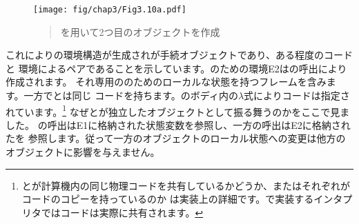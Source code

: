 \begin{figure}[tb]
\label{Figure 3.10}
\centering
\begin{comment}
\heading{Figure 3.10:} Using \code{(define W2 (make\-/withdraw 100))} to create a second object.

\begin{example}
         +-------------------------------------------------+
         | make-withdraw: ...                              |
global ->| W2: ---------------------------+                |
env      | W1: --+                        |                |
         +-------|------------------------|----------------+
                 |              ^         |              ^
                 |              |         |              |
                 |       +------+------+  |       +------+-------+
                 |  E1 ->| balance: 50 |  |  E2 ->| balance: 100 |
                 |       +-------------+  |       +--------------+
                 V              ^         V              ^
             .---.---.          |     .---.---.          |
             | O | O-+----------+     | O | O-+----------+
             `-|-^---'                `-|-^---'
               | +----------------------+
               V V
        parameters: amount
        body: ...
\end{example}
\end{comment}
\texttt{[image: fig/chap3/Fig3.10a.pdf]}
\begin{quote}
 を用いて2つ目のオブジェクトを作成
\end{quote}
\end{figure}

\noindent
これによりの環境構造が生成されが手続オブジェクトであり、ある程度のコードと
環境によるペアであることを示しています。のための環境E2はの呼出により作成されます。
それ専用ののためのローカルな状態を持つフレームを含みます。一方でとは同じ
コードを持ちます。のボディ内の\( \lambda \)式によりコードは指定されています。\footnote{
とが計算機内の同じ物理コードを共有しているかどうか、またはそれぞれがコードのコピーを持っているのか
は実装上の詳細です。で実装するインタプリタではコードは実際に共有されます。}
なぜとが独立したオブジェクトとして振る舞うのかをここで見ました。
の呼出はE1に格納された状態変数を参照し、一方の呼出はE2に格納されたを
参照します。従って一方のオブジェクトのローカル状態への変更は他方のオブジェクトに影響を与えません。

